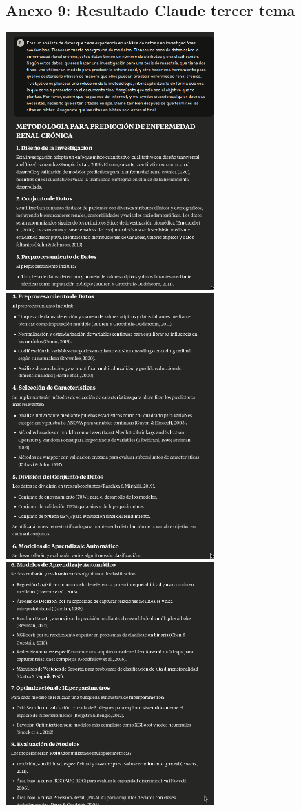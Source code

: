 \documentclass{article}
\begin{document}
\subsection{Anexo 9: Resultado Claude tercer tema}
\begin{center}
    \includegraphics[width=0.6\textwidth]{../claude_1_3.png}\\
    \includegraphics[width=0.6\textwidth]{../claude_2_3.png}\\
    \includegraphics[width=0.6\textwidth]{../claude_3_3.png}\\

\end{center}
\end{document}
